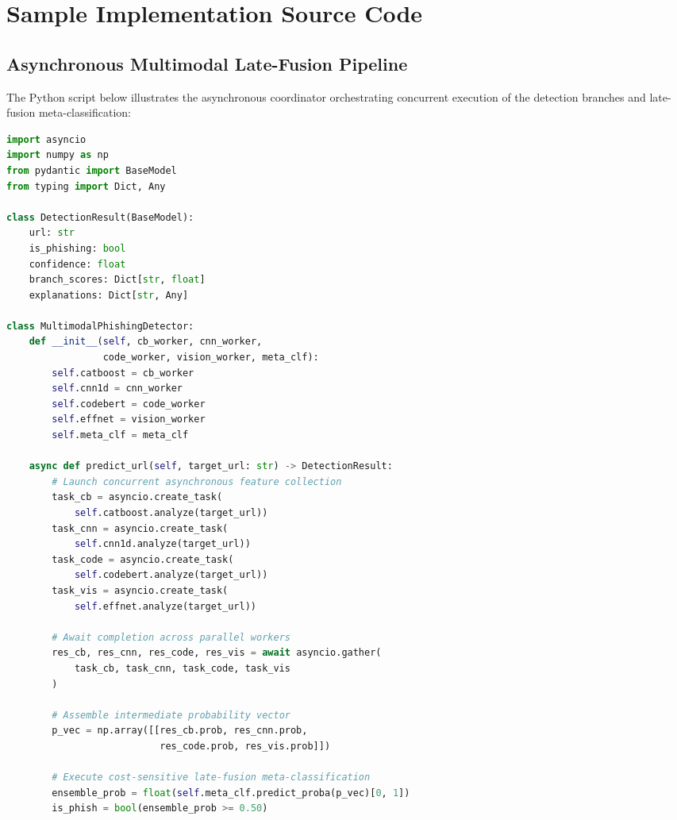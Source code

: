 \appendix

\chapter{Sample Implementation Source Code}

\section*{Asynchronous Multimodal Late-Fusion Pipeline}
The Python script below illustrates the asynchronous coordinator orchestrating concurrent execution of the detection branches and late-fusion meta-classification:

\begin{spacing}{1.1}
\begin{lstlisting}[language=Python, basicstyle=\footnotesize\ttfamily, breaklines=true, frame=single]
import asyncio
import numpy as np
from pydantic import BaseModel
from typing import Dict, Any

class DetectionResult(BaseModel):
    url: str
    is_phishing: bool
    confidence: float
    branch_scores: Dict[str, float]
    explanations: Dict[str, Any]

class MultimodalPhishingDetector:
    def __init__(self, cb_worker, cnn_worker, 
                 code_worker, vision_worker, meta_clf):
        self.catboost = cb_worker
        self.cnn1d = cnn_worker
        self.codebert = code_worker
        self.effnet = vision_worker
        self.meta_clf = meta_clf

    async def predict_url(self, target_url: str) -> DetectionResult:
        # Launch concurrent asynchronous feature collection
        task_cb = asyncio.create_task(
            self.catboost.analyze(target_url))
        task_cnn = asyncio.create_task(
            self.cnn1d.analyze(target_url))
        task_code = asyncio.create_task(
            self.codebert.analyze(target_url))
        task_vis = asyncio.create_task(
            self.effnet.analyze(target_url))

        # Await completion across parallel workers
        res_cb, res_cnn, res_code, res_vis = await asyncio.gather(
            task_cb, task_cnn, task_code, task_vis
        )

        # Assemble intermediate probability vector
        p_vec = np.array([[res_cb.prob, res_cnn.prob, 
                           res_code.prob, res_vis.prob]])

        # Execute cost-sensitive late-fusion meta-classification
        ensemble_prob = float(self.meta_clf.predict_proba(p_vec)[0, 1])
        is_phish = bool(ensemble_prob >= 0.50)


\end{lstlisting}
\end{spacing}
